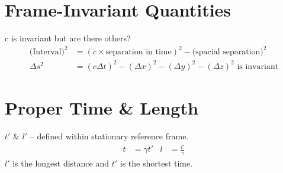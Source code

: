 \documentclass[a4paper, 11pt, normalem]{report}
\begin{document}
\section{Frame-Invariant Quantities}
c is invariant but are there others?
\begin{align}
    \text{(Interval)}^{2} &= \left(c\times\text{separation in time}\right)^{2} - \text{(spacial separation)}^{2} \\
    \Delta s^{2} &= (c\Delta t)^{2} - (\Delta x)^{2} - (\Delta y)^{2} - (\Delta z)^{2}\text{ is invariant}
\end{align}

\section{Proper Time \& Length}
$t'$ \& $l'$ -- defined within stationary reference frame.
\begin{align}
    t &= \gamma t' & l &= \frac{l'}{\gamma}
\end{align}
$l'$ is the longest distance and $t'$ is the shortest time.
\end{document}
